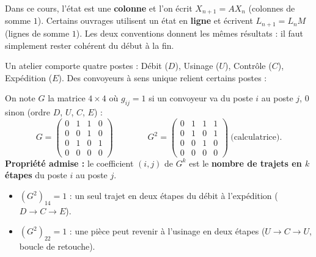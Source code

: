 \documentclass[a4paper,11pt]{article}
\newcommand{\M}[1]{\begin{pmatrix}#1\end{pmatrix}}
\begin{document}
\begin{remarque}
Dans ce cours, l'état est une \textbf{colonne} et l'on écrit $X_{n+1} = AX_n$ (colonnes de somme $1$). Certains ouvrages utilisent un état en \textbf{ligne} et écrivent $L_{n+1} = L_nM$ (lignes de somme $1$). Les deux conventions donnent les mêmes résultats : il faut simplement rester cohérent du début à la fin.
\end{remarque}

\begin{appliindus}\label{ex:reseau}
Un atelier comporte quatre postes : Débit ($D$), Usinage ($U$), Contrôle ($C$), Expédition ($E$). Des convoyeurs à sens unique relient certains postes :
\begin{center}
\end{center}
On note $G$ la matrice $4\times 4$ où $g_{ij}=1$ si un convoyeur va du poste $i$ au poste $j$, $0$ sinon (ordre $D$, $U$, $C$, $E$) :
\[
G = \M{0 & 1 & 1 & 0\\ 0 & 0 & 1 & 0\\ 0 & 1 & 0 & 1\\ 0 & 0 & 0 & 0}
\qquad\qquad
G^2 = \M{0 & 1 & 1 & 1\\ 0 & 1 & 0 & 1\\ 0 & 0 & 1 & 0\\ 0 & 0 & 0 & 0}\ \text{(calculatrice).}
\]
\textbf{Propriété admise :} le coefficient $(i,j)$ de $G^k$ est le \textbf{nombre de trajets en $k$ étapes} du poste $i$ au poste $j$.
\begin{itemize}
  \item $(G^2)_{14}=1$ : un seul trajet en deux étapes du débit à l'expédition ($D\to C\to E$).
  \item $(G^2)_{22}=1$ : une pièce peut revenir à l'usinage en deux étapes ($U\to C\to U$, boucle de retouche).
\end{itemize}
\end{appliindus}
\end{document}

